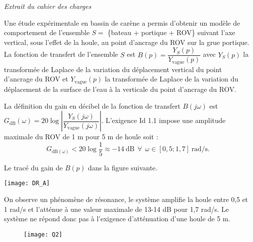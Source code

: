 \begin{multicols}{2}
\begin{center}
\textit{Extrait du cahier des charges}
\label{tab1}
\end{center}

\normalsize


Une étude expérimentale en bassin de carène a permis d’obtenir un modèle de comportement de l’ensemble
$S =$ \{bateau + portique + ROV\} suivant l’axe vertical, sous l’effet de la houle, au point d’ancrage du ROV sur
la grue portique.\\

La fonction de transfert de l’ensemble $S$ est $B(p) =\dfrac{Y_S(p)}{Y_{\text{vague}}(p)}$ avec $Y_S(p)$ la transformée de Laplace de la variation
du déplacement vertical du point d’ancrage du ROV et $Y_{\text{vague}}(p)$ la transformée de Laplace de la variation du déplacement de la surface de l’eau à la verticale du point d’ancrage du ROV.\\

\fi



\ifprof
\begin{corrige}

La définition du gain en décibel de la fonction de transfert $B(j\omega)$ est $G_{\text{dB}}(\omega)=20\log \left \vert \dfrac{Y_S(j\omega)}{Y_{\text{vague}}(j\omega)}\right \vert$. L'exigence Id 1.1 impose une amplitude maximale du ROV de 1 m pour 5 m de houle soit :
$$\boxed{G_{\text{dB}(\omega)}<20 \log \dfrac{1}{5}\approx - 14 \ \text{dB} \ \ \forall \ \ \omega\in[0,5;1,7]  \ \text{rad/s}.}$$
\end{corrige}
\else
\fi

\ifprof
\else
Le tracé du gain de $B(p)$ dans la figure suivante.



\begin{center}
\texttt{[image: DR\_A]}
\end{center}

\fi


\ifprof
\begin{corrige}
On observe un phénomène de résonance, le système amplifie la houle entre 0,5 et 1 rad/s et l’atténue à une valeur maximale de 13-14 dB pour 1,7 rad/s. Le syst\`eme ne répond donc pas \`a l’exigence d'atténuation d'une houle de 5 m.
\begin{figure}[H]
\centering
\texttt{[image: Q2]}
\end{figure}



\end{corrige}
\end{multicols}

